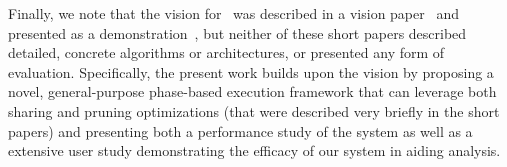 \noindent Finally, we note that the vision for \SeeDB\ was described 
in a vision paper~\cite{DBLP:conf/vldb/Parameswaran2013} and presented 
as a demonstration~\cite{DBLP:journals/pvldb/VartakMPP14}, 
but neither of these short papers described detailed, concrete algorithms or
architectures, or 
presented any form of evaluation.
Specifically, the present work builds 
upon the \SeeDB vision by proposing a novel, general-purpose phase-based
execution framework that can leverage both 
sharing and pruning optimizations (that were described very briefly
in the short papers)
and presenting both a performance study of the system as well as a extensive
user study demonstrating the efficacy of our system in aiding analysis.


